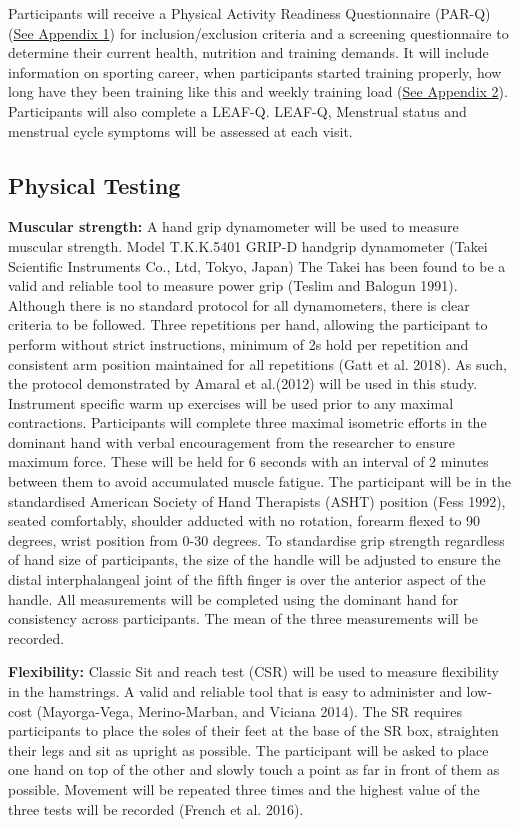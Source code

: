 \documentclass[
]{article}
\begin{document}
Participants will receive a Physical Activity Readiness Questionnaire (PAR-Q) (\hyperref[appendix-parq]{See Appendix 1}) for inclusion/exclusion criteria and a screening questionnaire to determine their current health, nutrition and training demands. It will include information on sporting career, when participants started training properly, how long have they been training like this and weekly training load (\hyperref[appendix-training]{See Appendix 2}). Participants will also complete a LEAF-Q. LEAF-Q, Menstrual status and menstrual cycle symptoms will be assessed at each visit.

\subsection{Physical Testing}\label{physical-testing}

\textbf{Muscular strength:} A hand grip dynamometer will be used to measure muscular strength. Model T.K.K.5401 GRIP-D handgrip dynamometer (Takei Scientific Instruments Co., Ltd, Tokyo, Japan) The Takei has been found to be a valid and reliable tool to measure power grip (Teslim and Balogun 1991). Although there is no standard protocol for all dynamometers, there is clear criteria to be followed. Three repetitions per hand, allowing the participant to perform without strict instructions, minimum of 2s hold per repetition and consistent arm position maintained for all repetitions (Gatt et al. 2018). As such, the protocol demonstrated by Amaral et al.(2012) will be used in this study. Instrument specific warm up exercises will be used prior to any maximal contractions. Participants will complete three maximal isometric efforts in the dominant hand with verbal encouragement from the researcher to ensure maximum force. These will be held for 6 seconds with an interval of 2 minutes between them to avoid accumulated muscle fatigue. The participant will be in the standardised American Society of Hand Therapists (ASHT) position (Fess 1992), seated comfortably, shoulder adducted with no rotation, forearm flexed to 90 degrees, wrist position from 0-30 degrees. To standardise grip strength regardless of hand size of participants, the size of the handle will be adjusted to ensure the distal interphalangeal joint of the fifth finger is over the anterior aspect of the handle. All measurements will be completed using the dominant hand for consistency across participants. The mean of the three measurements will be recorded.

\textbf{Flexibility:} Classic Sit and reach test (CSR) will be used to measure flexibility in the hamstrings. A valid and reliable tool that is easy to administer and low-cost (Mayorga-Vega, Merino-Marban, and Viciana 2014). The SR requires participants to place the soles of their feet at the base of the SR box, straighten their legs and sit as upright as possible. The participant will be asked to place one hand on top of the other and slowly touch a point as far in front of them as possible. Movement will be repeated three times and the highest value of the three tests will be recorded (French et al. 2016).
\end{document}
